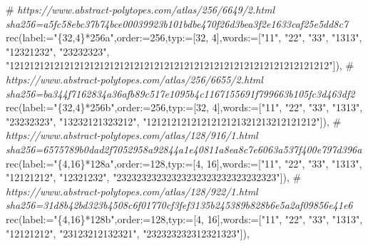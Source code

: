 \documentclass[
  10pt,
  letterpaper,
]{article}
\newenvironment{Shaded}{}{}
\newcommand{\CommentTok}[1]{\textcolor[rgb]{0.38,0.63,0.69}{\textit{#1}}}
\newcommand{\ExtensionTok}[1]{#1}
\newcommand{\FloatTok}[1]{\textcolor[rgb]{0.25,0.63,0.44}{#1}}
\newcommand{\NormalTok}[1]{#1}
\newcommand{\OperatorTok}[1]{\textcolor[rgb]{0.40,0.40,0.40}{#1}}
\newcommand{\StringTok}[1]{\textcolor[rgb]{0.25,0.44,0.63}{#1}}
\newcommand{\VariableTok}[1]{\textcolor[rgb]{0.10,0.09,0.49}{#1}}
\begin{document}
\begin{Shaded}
\begin{Highlighting}[]
\NormalTok{\#}\CommentTok{ https://www.abstract{-}polytopes.com/atlas/256/6649/2.html sha256=a5fc58ebc37b74bce00039923b101bdbe470f26d3bea3f2e1633caf25e5dd8c7}
\ExtensionTok{rec}\NormalTok{(}\VariableTok{label}\OperatorTok{:=}\StringTok{"\{32,4\}*256a"}\OperatorTok{,}\VariableTok{order}\OperatorTok{:=}\FloatTok{256}\OperatorTok{,}\VariableTok{typ}\OperatorTok{:=}\NormalTok{[}\FloatTok{32}\OperatorTok{,} \FloatTok{4}\NormalTok{]}\OperatorTok{,}\VariableTok{words}\OperatorTok{:=}\NormalTok{[}\StringTok{"11"}\OperatorTok{,} \StringTok{"22"}\OperatorTok{,} \StringTok{"33"}\OperatorTok{,} \StringTok{"1313"}\OperatorTok{,} \StringTok{"12321232"}\OperatorTok{,} \StringTok{"23232323"}\OperatorTok{,} \StringTok{"1212121212121212121212121212121212121212121212121212121212121212"}\NormalTok{])}\OperatorTok{,}
\NormalTok{\#}\CommentTok{ https://www.abstract{-}polytopes.com/atlas/256/6655/2.html sha256=ba344f7162834a36afb89c517e1095b4c1167155691f799663b105fc3d463df2}
\ExtensionTok{rec}\NormalTok{(}\VariableTok{label}\OperatorTok{:=}\StringTok{"\{32,4\}*256b"}\OperatorTok{,}\VariableTok{order}\OperatorTok{:=}\FloatTok{256}\OperatorTok{,}\VariableTok{typ}\OperatorTok{:=}\NormalTok{[}\FloatTok{32}\OperatorTok{,} \FloatTok{4}\NormalTok{]}\OperatorTok{,}\VariableTok{words}\OperatorTok{:=}\NormalTok{[}\StringTok{"11"}\OperatorTok{,} \StringTok{"22"}\OperatorTok{,} \StringTok{"33"}\OperatorTok{,} \StringTok{"1313"}\OperatorTok{,} \StringTok{"23232323"}\OperatorTok{,} \StringTok{"13232121323212"}\OperatorTok{,} \StringTok{"1212121212121212121321213212121212"}\NormalTok{])}\OperatorTok{,}
\NormalTok{\#}\CommentTok{ https://www.abstract{-}polytopes.com/atlas/128/916/1.html sha256=6575789b0dad2f7052958a92844a1e40811a8ea8c7e6063a537f400e797d396a}
\ExtensionTok{rec}\NormalTok{(}\VariableTok{label}\OperatorTok{:=}\StringTok{"\{4,16\}*128a"}\OperatorTok{,}\VariableTok{order}\OperatorTok{:=}\FloatTok{128}\OperatorTok{,}\VariableTok{typ}\OperatorTok{:=}\NormalTok{[}\FloatTok{4}\OperatorTok{,} \FloatTok{16}\NormalTok{]}\OperatorTok{,}\VariableTok{words}\OperatorTok{:=}\NormalTok{[}\StringTok{"11"}\OperatorTok{,} \StringTok{"22"}\OperatorTok{,} \StringTok{"33"}\OperatorTok{,} \StringTok{"1313"}\OperatorTok{,} \StringTok{"12121212"}\OperatorTok{,} \StringTok{"12321232"}\OperatorTok{,} \StringTok{"23232323232323232323232323232323"}\NormalTok{])}\OperatorTok{,}
\NormalTok{\#}\CommentTok{ https://www.abstract{-}polytopes.com/atlas/128/922/1.html sha256=31d8b42bd323b4508c6f01770cf3fef3135b245389b828b6e5a2af09856e41e6}
\ExtensionTok{rec}\NormalTok{(}\VariableTok{label}\OperatorTok{:=}\StringTok{"\{4,16\}*128b"}\OperatorTok{,}\VariableTok{order}\OperatorTok{:=}\FloatTok{128}\OperatorTok{,}\VariableTok{typ}\OperatorTok{:=}\NormalTok{[}\FloatTok{4}\OperatorTok{,} \FloatTok{16}\NormalTok{]}\OperatorTok{,}\VariableTok{words}\OperatorTok{:=}\NormalTok{[}\StringTok{"11"}\OperatorTok{,} \StringTok{"22"}\OperatorTok{,} \StringTok{"33"}\OperatorTok{,} \StringTok{"1313"}\OperatorTok{,} \StringTok{"12121212"}\OperatorTok{,} \StringTok{"23123212132321"}\OperatorTok{,} \StringTok{"232323232312321323"}\NormalTok{])}\OperatorTok{,}

\end{Highlighting}
\end{Shaded}
\end{document}
